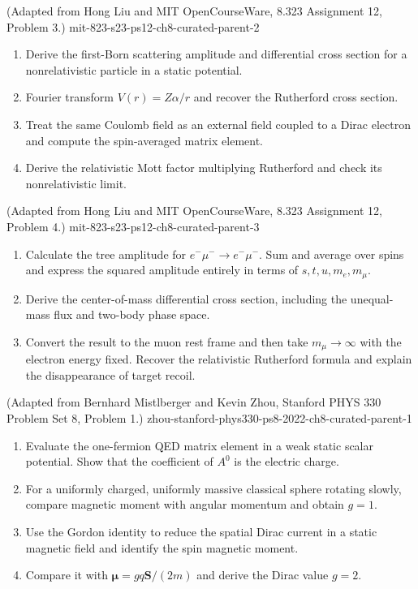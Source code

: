\begin{enumerate}
  {(Adapted from Hong Liu and MIT OpenCourseWare, 8.323 Assignment 12, Problem 3.)}
  {mit-823-s23-ps12-ch8-curated-parent-2}
\begin{enumerate}
\item Derive the first-Born scattering amplitude and differential cross
section for a nonrelativistic particle in a static potential.
\item Fourier transform \(V(r)=Z\alpha/r\) and recover the Rutherford
cross section.
\item Treat the same Coulomb field as an external field coupled to a
Dirac electron and compute the spin-averaged matrix element.
\item Derive the relativistic Mott factor multiplying Rutherford and
check its nonrelativistic limit.
\end{enumerate}

  {(Adapted from Hong Liu and MIT OpenCourseWare, 8.323 Assignment 12, Problem 4.)}
  {mit-823-s23-ps12-ch8-curated-parent-3}
\begin{enumerate}
\item
Calculate the tree amplitude for
\(e^-\mu^-\to e^-\mu^-\).  Sum and average over spins and express the
squared amplitude entirely in terms of \(s,t,u,m_e,m_\mu\).
\item
Derive the center-of-mass differential cross section, including the
unequal-mass flux and two-body phase space.
\item
Convert the result to the muon rest frame and then take
\(m_\mu\to\infty\) with the electron energy fixed.  Recover the
relativistic Rutherford formula and explain the disappearance of target
recoil.
\end{enumerate}

  {(Adapted from Bernhard Mistlberger and Kevin Zhou, Stanford PHYS 330 Problem Set 8, Problem 1.)}
  {zhou-stanford-phys330-ps8-2022-ch8-curated-parent-1}
\begin{enumerate}
\item
Evaluate the one-fermion QED matrix element in a weak static scalar
potential.  Show that the coefficient of \(A^0\) is the electric charge.
\item
For a uniformly charged, uniformly massive classical sphere rotating
slowly, compare magnetic moment with angular momentum and obtain \(g=1\).
\item
Use the Gordon identity to reduce the spatial Dirac current in a static
magnetic field and identify the spin magnetic moment.
\item
Compare it with \(\boldsymbol\mu=gq\mathbf S/(2m)\) and derive the
Dirac value \(g=2\).
\end{enumerate}


\end{enumerate}
